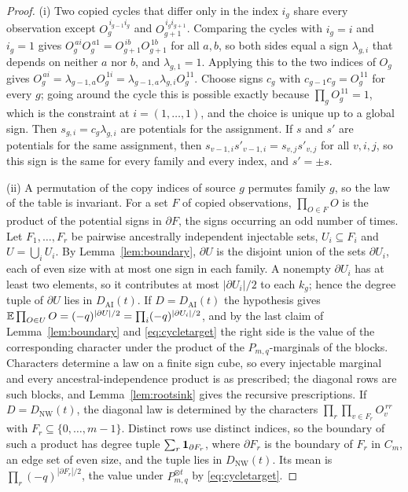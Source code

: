 \begin{proof}
(i) Two copied cycles that differ only in the index $i_g$ share every observation except $O_g^{\,i_{g-1}i_g}$ and $O_{g+1}^{\,i_gi_{g+1}}$. Comparing the cycles with $i_g=i$ and $i_g=1$ gives $O_g^{\,ai}O_g^{\,a1}=O_{g+1}^{\,ib}O_{g+1}^{\,1b}$ for all $a,b$, so both sides equal a sign $\lambda_{g,i}$ that depends on neither $a$ nor $b$, and $\lambda_{g,1}=1$. Applying this to the two indices of $O_g$ gives $O_g^{\,ai}=\lambda_{g-1,a}O_g^{\,1i}=\lambda_{g-1,a}\lambda_{g,i}O_g^{\,11}$. Choose signs $c_g$ with $c_{g-1}c_g=O_g^{\,11}$ for every $g$; going around the cycle this is possible exactly because $\prod_gO_g^{\,11}=1$, which is the constraint at $i=(1,\dots,1)$, and the choice is unique up to a global sign. Then $s_{g,i}=c_g\lambda_{g,i}$ are potentials for the assignment. If $s$ and $s'$ are potentials for the same assignment, then $s_{v-1,i}s'_{v-1,i}=s_{v,j}s'_{v,j}$ for all $v,i,j$, so this sign is the same for every family and every index, and $s'=\pm s$.

(ii) A permutation of the copy indices of source $g$ permutes family $g$, so the law of the table is invariant. For a set $F$ of copied observations, $\prod_{O\in F}O$ is the product of the potential signs in $\partial F$, the signs occurring an odd number of times. Let $F_1,\dots,F_r$ be pairwise ancestrally independent injectable sets, $U_i\subseteq F_i$ and $U=\bigcup_iU_i$. By Lemma~\ref{lem:boundary}, $\partial U$ is the disjoint union of the sets $\partial U_i$, each of even size with at most one sign in each family. A nonempty $\partial U_i$ has at least two elements, so it contributes at most $|\partial U_i|/2$ to each $k_g$; hence the degree tuple of $\partial U$ lies in $D_{\mathrm{AI}}(t)$. If $D=D_{\mathrm{AI}}(t)$ the hypothesis gives $\mathbb E\prod_{O\in U}O=(-q)^{|\partial U|/2}=\prod_i(-q)^{|\partial U_i|/2}$, and by the last claim of Lemma~\ref{lem:boundary} and \eqref{eq:cycletarget} the right side is the value of the corresponding character under the product of the $P_{m,q}$-marginals of the blocks. Characters determine a law on a finite sign cube, so every injectable marginal and every ancestral-independence product is as prescribed; the diagonal rows are such blocks, and Lemma~\ref{lem:rootsink} gives the recursive prescriptions. If $D=D_{\mathrm{NW}}(t)$, the diagonal law is determined by the characters $\prod_r\prod_{v\in F_r}O_v^{\,rr}$ with $F_r\subseteq\{0,\dots,m-1\}$. Distinct rows use distinct indices, so the boundary of such a product has degree tuple $\sum_r\mathbf 1_{\partial F_r}$, where $\partial F_r$ is the boundary of $F_r$ in $C_m$, an edge set of even size, and the tuple lies in $D_{\mathrm{NW}}(t)$. Its mean is $\prod_r(-q)^{|\partial F_r|/2}$, the value under $P_{m,q}^{\otimes t}$ by \eqref{eq:cycletarget}.
\end{proof}


